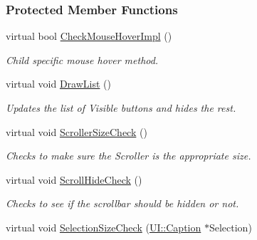 \subsubsection*{Protected Member Functions}
\begin{DoxyCompactItemize}
\item 
\hypertarget{classMezzanine_1_1UI_1_1ListBox_abc5d9bc871a42788cd2c64f91663513e}{
virtual bool \hyperlink{classMezzanine_1_1UI_1_1ListBox_abc5d9bc871a42788cd2c64f91663513e}{CheckMouseHoverImpl} ()}
\label{classMezzanine_1_1UI_1_1ListBox_abc5d9bc871a42788cd2c64f91663513e}

\begin{DoxyCompactList}\small\item\em Child specific mouse hover method. \item\end{DoxyCompactList}\item 
\hypertarget{classMezzanine_1_1UI_1_1ListBox_a59322b6ee0e6aa017e9b878f677d3154}{
virtual void \hyperlink{classMezzanine_1_1UI_1_1ListBox_a59322b6ee0e6aa017e9b878f677d3154}{DrawList} ()}
\label{classMezzanine_1_1UI_1_1ListBox_a59322b6ee0e6aa017e9b878f677d3154}

\begin{DoxyCompactList}\small\item\em Updates the list of Visible buttons and hides the rest. \item\end{DoxyCompactList}\item 
\hypertarget{classMezzanine_1_1UI_1_1ListBox_a352816786d0688c7522c1c5ffdadd416}{
virtual void \hyperlink{classMezzanine_1_1UI_1_1ListBox_a352816786d0688c7522c1c5ffdadd416}{ScrollerSizeCheck} ()}
\label{classMezzanine_1_1UI_1_1ListBox_a352816786d0688c7522c1c5ffdadd416}

\begin{DoxyCompactList}\small\item\em Checks to make sure the Scroller is the appropriate size. \item\end{DoxyCompactList}\item 
\hypertarget{classMezzanine_1_1UI_1_1ListBox_ab66f2d1e50943a19f1c125237ee0af62}{
virtual void \hyperlink{classMezzanine_1_1UI_1_1ListBox_ab66f2d1e50943a19f1c125237ee0af62}{ScrollHideCheck} ()}
\label{classMezzanine_1_1UI_1_1ListBox_ab66f2d1e50943a19f1c125237ee0af62}

\begin{DoxyCompactList}\small\item\em Checks to see if the scrollbar should be hidden or not. \item\end{DoxyCompactList}\item 
\hypertarget{classMezzanine_1_1UI_1_1ListBox_a215031e08cffa9ecdf5984a6f5905ce1}{
virtual void \hyperlink{classMezzanine_1_1UI_1_1ListBox_a215031e08cffa9ecdf5984a6f5905ce1}{SelectionSizeCheck} (\hyperlink{classMezzanine_1_1UI_1_1Caption}{UI::Caption} $\ast$Selection)}
\label{classMezzanine_1_1UI_1_1ListBox_a215031e08cffa9ecdf5984a6f5905ce1}


\end{DoxyCompactItemize}
